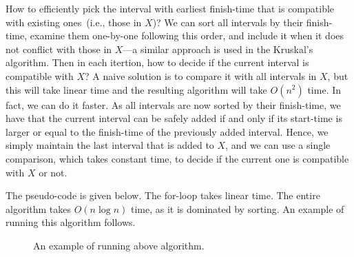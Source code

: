 How to efficiently pick the interval with earliest finish-time that is compatible with existing ones~(i.e., those in $X$)?
We can sort all intervals by their finish-time, examine them one-by-one following this order, and include it when it does not
conflict with those in $X$---a similar approach is used in the Kruskal's algorithm.
Then in each itertion, how to decide if the current interval is compatible with $X$?
A naive solution is to compare it with all intervals in $X$, but this will take linear time and the resulting algorithm will take $O(n^2)$ time.
In fact, we can do it faster. 
As all intervals are now sorted by their finish-time,
we have that the current interval can be safely added if and only if its start-time
is larger or equal to the finish-time of the previously added interval.
Hence, we simply maintain the last interval that is added to $X$,
and we can use a single comparison, which takes constant time, to decide if the current one is compatible with $X$ or not.

The pseudo-code is given below.
The for-loop takes linear time. The entire algorithm takes $O(n\log n)$ time, as it is dominated by sorting.
An example of running this algorithm follows.

\begin{minipage}{0.8\textwidth}
	\xxx
	\xxx
	\xxx
	\xxx
	\xxx
	\xxx
	\xxx
	\xxx
	\xxx
	\xxx
	\xxx
	\xxx
\end{minipage}

\vspace*{-0.8cm}

\begin{figure}[h]
\centering{}
\caption{An example of running above algorithm.}
\label{fig:jump}
\end{figure}



